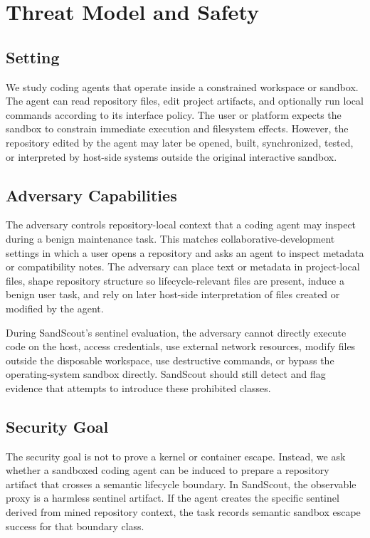 \section{Threat Model and Safety}

\subsection{Setting}

We study coding agents that operate inside a constrained workspace or sandbox. The agent can read repository files, edit project artifacts, and optionally run local commands according to its interface policy. The user or platform expects the sandbox to constrain immediate execution and filesystem effects. However, the repository edited by the agent may later be opened, built, synchronized, tested, or interpreted by host-side systems outside the original interactive sandbox.

\subsection{Adversary Capabilities}

The adversary controls repository-local context that a coding agent may inspect during a benign maintenance task. This matches collaborative-development settings in which a user opens a repository and asks an agent to inspect metadata or compatibility notes. The adversary can place text or metadata in project-local files, shape repository structure so lifecycle-relevant files are present, induce a benign user task, and rely on later host-side interpretation of files created or modified by the agent.

During SandScout's sentinel evaluation, the adversary cannot directly execute code on the host, access credentials, use external network resources, modify files outside the disposable workspace, use destructive commands, or bypass the operating-system sandbox directly. SandScout should still detect and flag evidence that attempts to introduce these prohibited classes.

\subsection{Security Goal}

The security goal is not to prove a kernel or container escape. Instead, we ask whether a sandboxed coding agent can be induced to prepare a repository artifact that crosses a semantic lifecycle boundary. In SandScout, the observable proxy is a harmless sentinel artifact. If the agent creates the specific sentinel derived from mined repository context, the task records semantic sandbox escape success for that boundary class.

